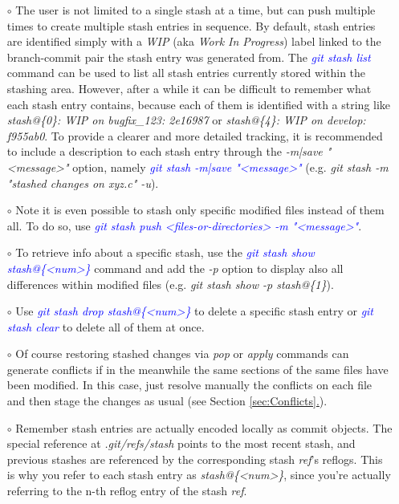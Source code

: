 \documentclass[a4paper,portrait,10pt]{article}   %
\newcommand{\mybulletlvA}{$\circ$}   %
\newcommand{\mycmd}[1]{\textcolor{blue}{\textit{#1}}}   %
\newcommand{\myparvspace}{\vspace{4mm}}   %
\newcommand{\mysecref}[1]{\hyperref[#1]{\ref{#1}.}}   %
\begin{document}
\begin{itemize}
\item[\mybulletlvA] The user is not limited to a single stash at a time, but can push multiple times to create multiple stash entries in sequence. By default, stash entries are identified simply with a \textit{WIP} (aka \textit{Work In Progress}) label linked to the branch-commit pair the stash entry was generated from. The \mycmd{git stash list} command can be used to list all stash entries currently stored within the stashing area. However, after a while it can be difficult to remember what each stash entry contains, because each of them is identified with a string like \textit{stash@\{0\}: WIP on bugfix\_123: 2e16987} or \textit{stash@\{4\}: WIP on develop: f955ab0}. To provide a clearer and more detailed tracking, it is recommended to include a description to each stash entry through the \textit{-m|save "<message>"} option, namely \mycmd{git stash -m|save "<message>"} (e.g. \textit{git stash -m "stashed changes on xyz.c" -u}).
\myparvspace

\item[\mybulletlvA] Note it is even possible to stash only specific modified files instead of them all. To do so, use \mycmd{git stash push <files-or-directories> -m "<message>"}.
\myparvspace

\item[\mybulletlvA] To retrieve info about a specific stash, use the \mycmd{git stash show stash@\{<num>\}} command and add the \textit{-p} option to display also all differences within modified files (e.g. \textit{git stash show -p stash@\{1\}}).
\myparvspace

\item[\mybulletlvA] Use \mycmd{git stash drop stash@\{<num>\}} to delete a specific stash entry or \mycmd{git stash clear} to delete all of them at once.
\myparvspace

\item[\mybulletlvA] Of course restoring stashed changes via \textit{pop} or \textit{apply} commands can generate conflicts if in the meanwhile the same sections of the same files have been modified. In this case, just resolve manually the conflicts on each file and then stage the changes as usual (see Section \mysecref{sec:Conflicts}).
\myparvspace

\item[\mybulletlvA] Remember stash entries are actually encoded locally as commit objects. The special reference at \textit{.git/refs/stash} points to the most recent stash, and previous stashes are referenced by the corresponding stash \textit{ref}'s reflogs. This is why you refer to each stash entry as \textit{stash@\{<num>\}}, since you're actually referring to the n-th reflog entry of the stash \textit{ref}.
\myparvspace


\end{itemize}
\end{document}
